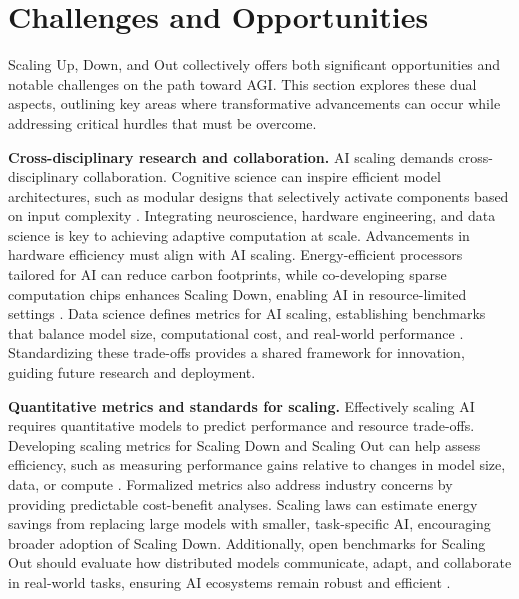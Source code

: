 \section{Challenges and Opportunities}

Scaling Up, Down, and Out collectively offers both significant opportunities and notable challenges on the path toward AGI. This section explores these dual aspects, outlining key areas where transformative advancements can occur while addressing critical hurdles that must be overcome.

\textbf{Cross-disciplinary research and collaboration.}
AI scaling demands cross-disciplinary collaboration. Cognitive science can inspire efficient model architectures, such as modular designs that selectively activate components based on input complexity \cite{laird2017standard}. Integrating neuroscience, hardware engineering, and data science is key to achieving adaptive computation at scale.
Advancements in hardware efficiency must align with AI scaling. Energy-efficient processors tailored for AI can reduce carbon footprints, while co-developing sparse computation chips enhances Scaling Down, enabling AI in resource-limited settings \cite{james2022agi_chip}.
Data science defines metrics for AI scaling, establishing benchmarks that balance model size, computational cost, and real-world performance \cite{kaplan2020scaling}. Standardizing these trade-offs provides a shared framework for innovation, guiding future research and deployment.

\textbf{Quantitative metrics and standards for scaling.}
Effectively scaling AI requires quantitative models to predict performance and resource trade-offs. Developing scaling metrics for Scaling Down and Scaling Out can help assess efficiency, such as measuring performance gains relative to changes in model size, data, or compute \cite{kaplan2020scaling}. Formalized metrics also address industry concerns by providing predictable cost-benefit analyses. Scaling laws can estimate energy savings from replacing large models with smaller, task-specific AI, encouraging broader adoption of Scaling Down. Additionally, open benchmarks for Scaling Out should evaluate how distributed models communicate, adapt, and collaborate in real-world tasks, ensuring AI ecosystems remain robust and efficient \cite{dou2023agi_iot}.

